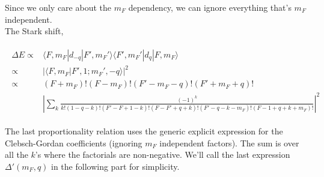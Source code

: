 \documentclass[10pt,fleqn]{article}
\newcommand{\eqar}[1]
{
  \begin{align}
    #1
  \end{align}
}
\newcommand{\abs}[1]{{\left|{#1}\right|}}
\begin{document}
Since we only care about the $m_F$ dependency, we can ignore everything that's
$m_F$ independent.\\

The Stark shift,
\eqar{
  \begin{split}
    \Delta E\propto&\langle F,m_F|d_{-q}|F',m_F'\rangle
                     \langle F',m_F'|d_q|F,m_F\rangle\\
    \propto&\abs{\langle F,m_F|F',1;m_F',-q\rangle}^2\\
    \propto&(F+m_F)!(F-m_F)!(F'-m_F-q)!(F'+m_F+q)!\\
                   &\abs{\sum_{k}\frac{(-1)^k}{k!(1\!-\!q\!-\!k)!(F'\!-\!F\!+\!1\!-\!k)!(F\!-\!F'\!+\!q\!+\!k)!(F'\!-\!q\!-\!k\!-\!m_F)!(F\!-\!1\!+\!q\!+\!k\!+\!m_F)!}}^2
  \end{split}
}
The last proportionality relation uses the generic explicit expression for the
Clebsch-Gordan coefficients (ignoring $m_F$ independent factors).
The sum is over all the $k$'s where the factorials are non-negative.
We'll call the last expression $\Delta'(m_F,q)$ in the following part for simplicity.
\end{document}
